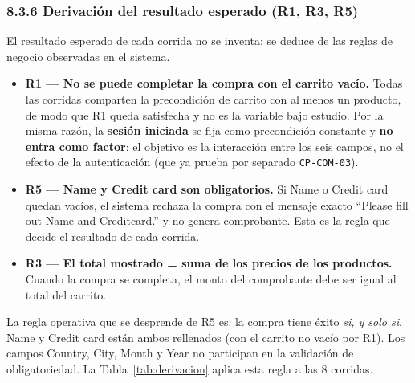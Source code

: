 \subsubsection*{8.3.6 Derivación del resultado esperado (R1, R3, R5)}

El resultado esperado de cada corrida no se inventa: se deduce de las reglas de negocio
observadas en el sistema.

\begin{itemize}
  \item \textbf{R1 — No se puede completar la compra con el carrito vacío.} Todas las
        corridas comparten la precondición de carrito con al menos un producto, de modo
        que R1 queda satisfecha y no es la variable bajo estudio. Por la misma razón, la
        \textbf{sesión iniciada} se fija como precondición constante y \textbf{no entra
        como factor}: el objetivo es la interacción entre los seis campos, no el efecto
        de la autenticación (que ya prueba por separado \texttt{CP-COM-03}).
  \item \textbf{R5 — Name y Credit card son obligatorios.} Si Name o Credit card quedan
        vacíos, el sistema rechaza la compra con el mensaje exacto ``Please fill out
        Name and Creditcard.'' y no genera comprobante. Esta es la regla que decide el
        resultado de cada corrida.
  \item \textbf{R3 — El total mostrado = suma de los precios de los productos.} Cuando
        la compra se completa, el monto del comprobante debe ser igual al total del
        carrito.
\end{itemize}

La regla operativa que se desprende de R5 es: la compra tiene éxito \emph{si, y solo
si}, Name y Credit card están ambos rellenados (con el carrito no vacío por R1). Los
campos Country, City, Month y Year no participan en la validación de obligatoriedad. La
Tabla~\ref{tab:derivacion} aplica esta regla a las 8 corridas.

